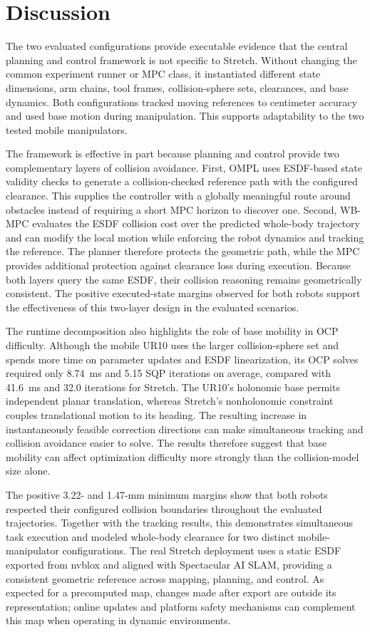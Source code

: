 \documentclass[conference]{IEEEtran}
\begin{document}
\section{Discussion}

The two evaluated configurations provide executable evidence that the central planning and
control framework is not specific to Stretch.  Without changing the common
experiment runner or MPC class, it instantiated different state dimensions,
arm chains, tool frames, collision-sphere sets, clearances, and base dynamics.
Both configurations tracked moving references to centimeter accuracy and used
base motion during manipulation.  This supports adaptability to the two tested
mobile manipulators.

The framework is effective in part because planning and control provide two
complementary layers of collision avoidance.  First, OMPL uses ESDF-based state
validity checks to generate a collision-checked reference path with the
configured clearance.  This supplies the controller with a globally meaningful
route around obstacles instead of requiring a short MPC horizon to discover
one.  Second, WB-MPC evaluates the ESDF collision cost over the predicted
whole-body trajectory and can modify the local motion while enforcing the
robot dynamics and tracking the reference.  The planner therefore protects the
geometric path, while the MPC provides additional protection against clearance
loss during execution.  Because both layers query the same ESDF, their
collision reasoning remains geometrically consistent.  The positive
executed-state margins observed for both robots support the effectiveness of
this two-layer design in the evaluated scenarios.

The runtime decomposition also highlights the role of base mobility in OCP
difficulty.  Although the mobile UR10 uses the larger collision-sphere set and
spends more time on parameter updates and ESDF linearization, its OCP solves
required only 8.74~ms and 5.15 SQP iterations on average, compared with
41.6~ms and 32.0 iterations for Stretch.  The UR10's holonomic base permits
independent planar translation, whereas Stretch's nonholonomic constraint
couples translational motion to its heading.  The resulting increase in
instantaneously feasible correction directions can make simultaneous tracking
and collision avoidance easier to solve.  The results therefore suggest that
base mobility can affect optimization difficulty more strongly than the
collision-model size alone.

The positive 3.22- and 1.47-mm minimum margins show that both robots respected
their configured collision boundaries throughout the evaluated trajectories.
Together with the tracking results, this demonstrates simultaneous task
execution and modeled whole-body clearance for two distinct mobile-manipulator
configurations.  The real Stretch deployment uses a static ESDF exported from
nvblox and aligned with Spectacular AI SLAM, providing a consistent
geometric reference across mapping, planning, and control.  As expected for a
precomputed map, changes made after export are outside its representation;
online updates and platform safety mechanisms can complement this map when
operating in dynamic environments.
\end{document}

